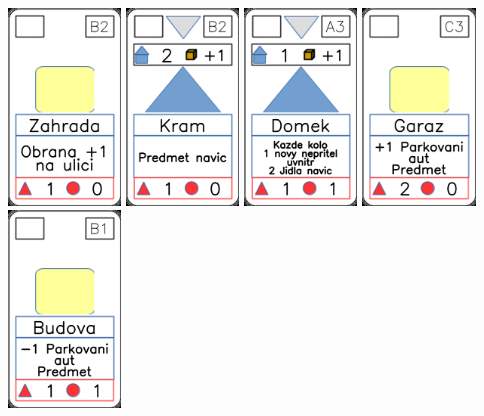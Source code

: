 \documentclass[a4paper]{article}
\begin{document}
	\includegraphics[width=3.0cm]{img-2_21}
	\includegraphics[width=3.0cm]{img-3_6}
	\includegraphics[width=3.0cm]{img-3_2}
	\includegraphics[width=3.0cm]{img-2_12}
	\includegraphics[width=3.0cm]{img-2_5}
\end{document}
